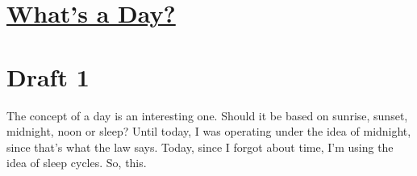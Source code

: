 \documentclass[12pt]{article}[titlepage]
\newcommand{\1}{\={a}}
\newcommand{\2}{\={e}}
\newcommand{\3}{\={\i}}
\newcommand{\4}{\=o}
\newcommand{\5}{\=u}
\newcommand{\6}{\={A}}
\renewcommand{\,}{\textsuperscript{,}}
\begin{document}
\doublespacing
\section{\href{whats-a-day.html}{What's a Day?}}
\section{Draft 1}
The concept of a day is an interesting one.
Should it be based on sunrise, sunset, midnight, noon or sleep?
Until today, I was operating under the idea of midnight, since that's what the law says.
Today, since I forgot about time, I'm using the idea of sleep cycles.
So, this.
\end{document}
